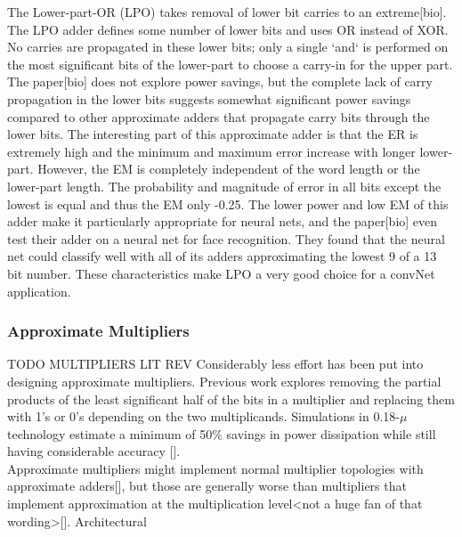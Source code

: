 \documentclass[conference]{IEEEtran}
\begin{document}
	\indent The Lower-part-OR (LPO) takes removal of lower bit carries to an extreme[bio]. The LPO adder defines some number of lower bits and uses OR instead of XOR. No carries are propagated in these lower bits; only a single `and` is performed on the most significant bits of the lower-part to choose a carry-in for the upper part. The paper[bio] does not explore power savings, but the complete lack of carry propagation in the lower bits suggests somewhat significant power savings compared to other approximate adders that propagate carry bits through the lower bits. The interesting part of this approximate adder is that the ER is extremely high and the minimum and maximum error increase with longer lower-part. However, the EM is completely independent of the word length or the lower-part length. The probability and magnitude of error in all bits except the lowest is equal and thus the EM only -0.25. The lower power and low EM of this adder make it particularly appropriate for neural nets, and the paper[bio] even test their adder on a neural net for face recognition. They found that the neural net could classify well with all of its adders approximating the lowest 9 of a 13 bit number. These characteristics make LPO a very good choice for a convNet application.\\
	  
	\subsubsection{Approximate Multipliers}
TODO MULTIPLIERS LIT REV
	\indent Considerably less effort has been put into designing approximate multipliers. Previous work explores removing the partial products of the least significant half of the bits in a multiplier and replacing them with 1's or 0's depending on the two multiplicands. Simulations in 0.18-$\mu$ technology estimate a minimum of 50\% savings in power dissipation while still having considerable accuracy [].\\
	\indent Approximate multipliers might implement normal multiplier topologies with approximate adders[], but those are generally worse than multipliers that implement approximation at the multiplication level<not a huge fan of that wording>[]. Architectural \\
	
\end{document}

